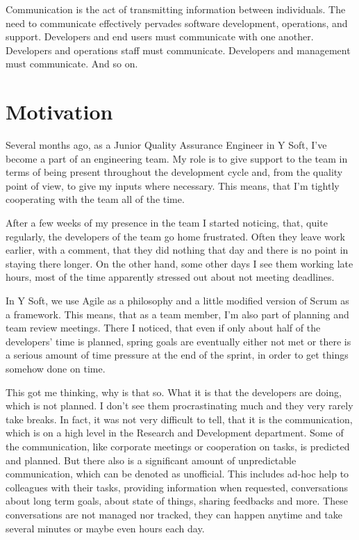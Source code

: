\documentclass[11pt,singleside]{myfithesis2}
\begin{document}
Communication is the act of transmitting information between individuals. The need to communicate effectively pervades software development, operations, and support. Developers and end users must communicate with one another. Developers and operations staff must communicate. Developers and management must communicate. And so on.


	\section{Motivation}
Several months ago, as a Junior Quality Assurance Engineer in Y Soft, I've become a part of an engineering team. My role is to give support to the team in terms of being present throughout the development cycle and, from the quality point of view, to give my inputs where necessary. This means, that I'm tightly cooperating with the team all of the time. 

After a few weeks of my presence in the team I started noticing, that, quite regularly, the developers of the team go home frustrated. Often they leave work earlier, with a comment, that they did nothing that day and there is no point in staying there longer. On the other hand, some other days I see them working late hours, most of the time apparently stressed out about not meeting deadlines.

In Y Soft, we use Agile as a philosophy and a little modified version of Scrum as a framework. This means, that as a team member, I'm also part of planning and team review meetings. There I noticed, that even if only about half of the developers' time is planned, spring goals are eventually either not met or there is a serious amount of time pressure at the end of the sprint, in order to get things somehow done on time.

This got me thinking, why is that so. What it is that the developers are doing, which is not planned. I don't see them procrastinating much and they very rarely take breaks. In fact, it was not very difficult to tell, that it is the communication, which is on a high level in the Research and Development department. Some of the communication, like corporate meetings or cooperation on tasks, is predicted and planned. But there also is a significant amount of unpredictable communication, which can be denoted as unofficial. This includes ad-hoc help to colleagues with their tasks, providing information when requested, conversations about long term goals, about state of things, sharing feedbacks and more. These conversations are not managed nor tracked, they can happen anytime and take several minutes or maybe even hours each day.
\end{document}
